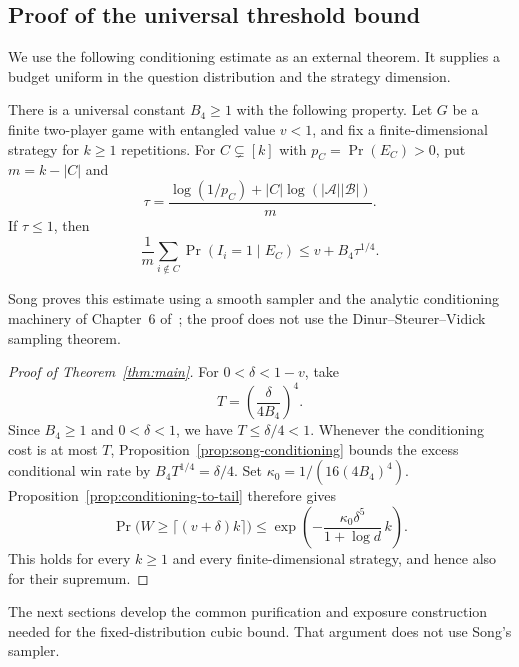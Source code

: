 \subsection{Proof of the universal threshold bound}

We use the following conditioning estimate as an external theorem.
It supplies a budget uniform in the question distribution and the
strategy dimension.

\begin{proposition}
\label{prop:song-conditioning}
There is a universal constant $B_4\ge1$ with the following property.
Let $G$ be a finite two-player game with entangled value $v<1$, and fix
a finite-dimensional strategy for $k\ge1$ repetitions. For
$C\subsetneq[k]$ with $p_C=\Pr(E_C)>0$, put $m=k-|C|$ and
\[
 \tau=\frac{\log(1/p_C)+|C|\log(|\mathcal A||\mathcal B|)}m.
\]
If $\tau\le1$, then
\begin{equation}\label{eq:song-conditioning}
 \frac1m\sum_{i\notin C}\Pr(I_i=1\mid E_C)
 \le v+B_4\tau^{1/4}.
\end{equation}
\end{proposition}

Song proves this estimate using a smooth sampler and the analytic
conditioning machinery of Chapter~6 of~\cite{tenadvances2026}; the
proof does not use the Dinur--Steurer--Vidick sampling theorem.

\begin{proof}[Proof of Theorem~\ref{thm:main}]
For $0<\delta<1-v$, take
\[
 T=\left(\frac\delta{4B_4}\right)^4.
\]
Since $B_4\ge1$ and $0<\delta<1$, we have $T\le\delta/4<1$.
Whenever the conditioning cost is at most $T$,
Proposition~\ref{prop:song-conditioning} bounds the excess conditional
win rate by $B_4T^{1/4}=\delta/4$.
Set $\kappa_0=1/(16(4B_4)^4)$.
Proposition~\ref{prop:conditioning-to-tail} therefore gives
\begin{equation}\label{eq:universal-threshold-rate}
 \Pr\bigl(W\ge\lceil(v+\delta)k\rceil\bigr)
 \le\exp\left(-\frac{\kappa_0\delta^5}{1+\log d}\,k\right).
\end{equation}
This holds for every $k\ge1$ and every finite-dimensional strategy,
and hence also for their supremum.
\end{proof}

The next sections develop the common purification and exposure
construction needed for the fixed-distribution cubic bound. That argument
does not use Song's sampler.
